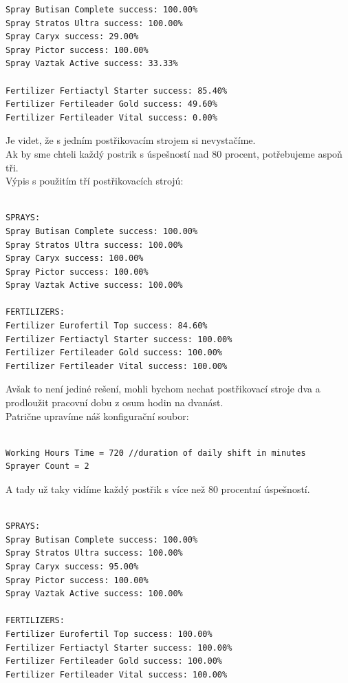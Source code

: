 \documentclass[11pt,a4paper,titlepage]{article}
\begin{document}
\begin{lstlisting}
Spray Butisan Complete success: 100.00%
Spray Stratos Ultra success: 100.00%
Spray Caryx success: 29.00%
Spray Pictor success: 100.00%
Spray Vaztak Active success: 33.33%

Fertilizer Fertiactyl Starter success: 85.40%
Fertilizer Fertileader Gold success: 49.60%
Fertilizer Fertileader Vital success: 0.00%
\end{lstlisting}
\vspace{45px}
Je videt, že s jedním postřikovacím strojem si nevystačíme.\\
Ak by sme chteli každý postrik s úspešností nad 80 procent, potřebujeme aspoň tři. \\
Výpis s použitím tří postřikovacích strojú: \\ \\
\begin{lstlisting}
SPRAYS: 
Spray Butisan Complete success: 100.00%
Spray Stratos Ultra success: 100.00%
Spray Caryx success: 100.00%
Spray Pictor success: 100.00%
Spray Vaztak Active success: 100.00%

FERTILIZERS: 
Fertilizer Eurofertil Top success: 84.60%
Fertilizer Fertiactyl Starter success: 100.00%
Fertilizer Fertileader Gold success: 100.00%
Fertilizer Fertileader Vital success: 100.00%
\end{lstlisting}
\vspace{45px}
Avšak to není jediné rešení, mohli bychom nechat postřikovací stroje dva a prodloužit pracovní dobu z osum hodin na dvanást.\\
Patrične upravíme náš konfigurační soubor: \\ \\
\begin{lstlisting}
Working Hours Time = 720 //duration of daily shift in minutes
Sprayer Count = 2
\end{lstlisting}
\vspace{45px}
A tady už taky vidíme každý postřik s více než 80 procentní úspešností. \\ \\
\begin{lstlisting}
SPRAYS: 
Spray Butisan Complete success: 100.00%
Spray Stratos Ultra success: 100.00%
Spray Caryx success: 95.00%
Spray Pictor success: 100.00%
Spray Vaztak Active success: 100.00%

FERTILIZERS: 
Fertilizer Eurofertil Top success: 100.00%
Fertilizer Fertiactyl Starter success: 100.00%
Fertilizer Fertileader Gold success: 100.00%
Fertilizer Fertileader Vital success: 100.00%
\end{lstlisting}

\newpage

\end{document}
